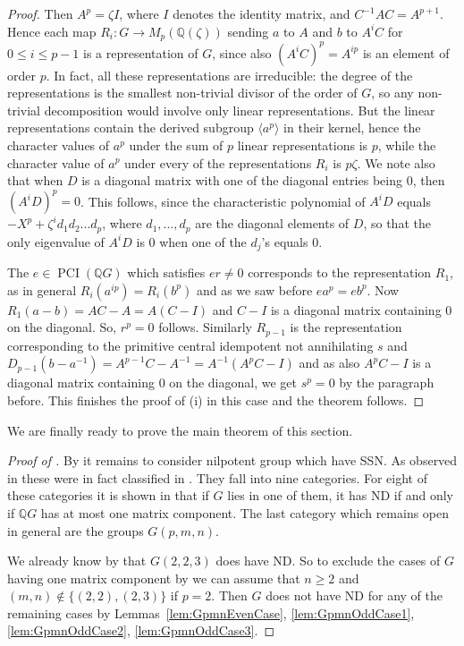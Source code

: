 \documentclass[a4paper,10pt]{amsart}
\theoremstyle{definition}
\theoremstyle{remark}
\newcommand\PCI{\operatorname{PCI}}
\newcommand{\Q}{{\mathbb Q}}
\begin{document}
\begin{proof}
Then $A^p = \zeta I$, where $I$ denotes the identity matrix, and $C^{-1}AC = A^{p+1}$. Hence each map $R_i: G \rightarrow M_p(\mathbb{Q}(\zeta))$ sending $a$ to $A$ and $b$ to $A^iC$ for $0 \leq i \leq p-1$ is a representation of $G$, since also $(A^iC)^p = A^{ip}$ is an element of order $p$. In fact, all these representations are irreducible: the degree of the representations is the smallest non-trivial divisor of the order of $G$, so any non-trivial decomposition would involve only linear representations. But the linear representations contain the derived subgroup $\langle a^p \rangle$ in their kernel, hence the character values of $a^p$ under the sum of $p$ linear representations is $p$, while the character value of $a^p$ under every of the representations $R_i$ is $p\zeta$. We note also that when $D$ is a diagonal matrix with one of the diagonal entries being $0$, then $(A^iD)^p=0$. This follows, since the characteristic polynomial of $A^iD$ equals $-X^p + \zeta^id_1d_2...d_p$, where $d_1,...,d_p$ are the diagonal elements of $D$, so that the only eigenvalue of $A^iD$ is $0$ when one of the $d_j$'s equals $0$.

The $e \in \PCI(\Q G)$ which satisfies $er \neq 0$ corresponds to the representation $R_1$, as in general $R_i(a^{ip}) = R_i(b^p)$ and as we saw before $ea^p = eb^p$. Now $R_1(a-b) = AC-A = A(C-I)$ and $C-I$ is a diagonal matrix containing $0$ on the diagonal. So, $r^p = 0$ follows. Similarly $R_{p-1}$ is the representation corresponding to the primitive central idempotent not annihilating $s$ and $D_{p-1}(b-a^{-1}) = A^{p-1}C - A^{-1} = A^{-1}(A^pC-I)$ and as also $A^pC-I$ is a diagonal matrix containing $0$ on the diagonal, we get $s^p= 0$ by the paragraph before. This finishes the proof of (i) in this case and the theorem follows.
\end{proof}


We are finally ready to prove the main theorem of this section.

\begin{proof}[Proof of ]
By  it remains to consider nilpotent group which have SSN. As observed in \cite[Section 4]{LiuPassman16} these were in fact classified in \cite{BozikovJanko}. They fall into nine categories. For eight of these categories it is shown in \cite[Section 4]{JespersSun} that if $G$ lies in one of them, it has ND if and only if $\mathbb{Q}G$ has at most one matrix component. The last category which remains open in general are the groups $G(p,m,n)$.

We already know by  that $G(2,2,3)$ does have ND. So to exclude the cases of $G$ having one matrix component by  we can assume that $n \geq 2$ and $(m,n) \notin \{(2,2),(2,3) \}$ if $p=2$. Then $G$ does not have ND for any of the remaining cases by Lemmas~\ref{lem:GpmnEvenCase}, \ref{lem:GpmnOddCase1}, \ref{lem:GpmnOddCase2}, \ref{lem:GpmnOddCase3}.
\end{proof}
\end{document}
